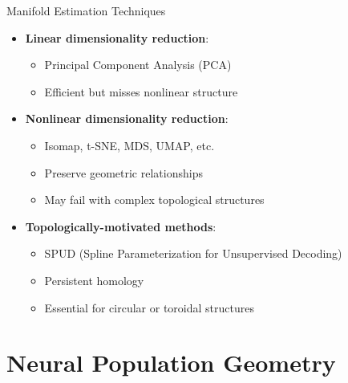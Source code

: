 \documentclass[aspectratio=169]{beamer}
\begin{document}
\begin{frame}{Manifold Estimation Techniques}
    \begin{itemize}
        \item \textbf{Linear dimensionality reduction}:
        \begin{itemize}
            \item Principal Component Analysis (PCA)
            \item Efficient but misses nonlinear structure
        \end{itemize}
        
        \item \textbf{Nonlinear dimensionality reduction}:
        \begin{itemize}
            \item Isomap, t-SNE, MDS, UMAP, etc.
            \item Preserve geometric relationships
            \item May fail with complex topological structures
        \end{itemize}
        
        \item \textbf{Topologically-motivated methods}:
        \begin{itemize}
            \item SPUD (Spline Parameterization for Unsupervised Decoding)
            \item Persistent homology
            \item Essential for circular or toroidal structures
        \end{itemize}
    \end{itemize}
\end{frame}

\section{Neural Population Geometry}
\end{document}

